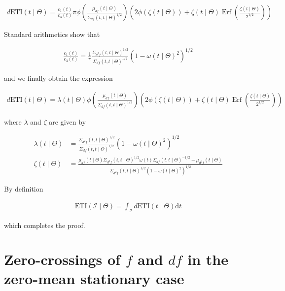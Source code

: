 \documentclass[11pt,]{article}
\DeclareMathOperator*{\Erf}{Erf}
\theoremstyle{nonumberplain}
\begin{document}
\begin{align*}
d\mathrm{ETI}(t \mid \Theta) = \frac{c_1(t)}{c_3(t)}\pi\phi\left(\frac{\mu_{df}(t \mid \Theta)}{\Sigma_{df}(t,t \mid \Theta)^{1/2}}\right)\left(2\phi(\zeta(t \mid \Theta)) + \zeta(t \mid \Theta)\Erf\left(\frac{\zeta(t\mid \Theta)}{2^{1/2}}\right)\right)
\end{align*}

Standard arithmetics show that

\begin{align*}
\frac{c_1(t)}{c_3(t)} =  \frac{1}{\pi}\frac{\Sigma_{d^2\!f}(t,t \mid \Theta)^{1/2}}{\Sigma_{df}(t,t \mid \Theta)^{1/2}}\left(1-\omega(t \mid \Theta)^2\right)^{1/2}
\end{align*}

and we finally obtain the expression

\begin{align*}
d\mathrm{ETI}(t \mid \Theta) = \lambda(t \mid \Theta)\phi\left(\frac{\mu_{df}(t \mid \Theta)}{\Sigma_{df}(t,t \mid \Theta)^{1/2}}\right)\left(2\phi(\zeta(t \mid \Theta)) + \zeta(t \mid \Theta)\Erf\left(\frac{\zeta(t \mid \Theta)}{2^{1/2}}\right)\right)
\end{align*}

where \(\lambda\) and \(\zeta\) are given by

\begin{align*}
\lambda(t \mid \Theta) &= \frac{\Sigma_{d^2\!f}(t,t \mid \Theta)^{1/2}}{\Sigma_{df}(t,t \mid \Theta)^{1/2}}\left(1-\omega(t \mid \Theta)^2\right)^{1/2}\\
  \zeta(t \mid \Theta) &= \frac{\mu_{df}(t \mid \Theta)\Sigma_{d^2\!f}(t,t \mid \Theta)^{1/2}\omega(t)\Sigma_{df}(t,t \mid \Theta)^{-1/2} - \mu_{d^2\!f}(t \mid \Theta)}{\Sigma_{d^2\!f}(t,t \mid \Theta)^{1/2}\left(1 - \omega(t \mid \Theta)^2\right)^{1/2}}
\end{align*}

By definition

\begin{align*}
  \mathrm{ETI}(\mathcal{I} \mid \Theta) = \int_{\mathcal{I}} d\mathrm{ETI}(t \mid \Theta)\mathrm{d}t
\end{align*}

which completes the proof.

\section{Zero-crossings of $f$ and $df$ in the zero-mean stationary case}\label{sec:appendix3}
\end{document}
